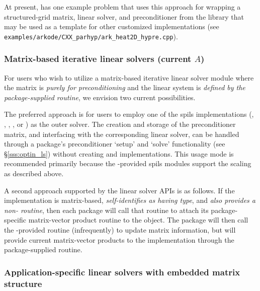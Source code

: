 At present, {\sundials} has one example problem that uses this approach for
wrapping a structured-grid matrix, linear solver, and preconditioner from the
{\hypre} library that may be used as a template for other customized
implementations
(see \texttt{examples/arkode/CXX\_parhyp/ark\_heat2D\_hypre.cpp}).

\subsubsection*{Matrix-based iterative linear solvers (current $A$)}

For users who wish to utilize a matrix-based iterative linear solver module
where the matrix is \textit{purely for preconditioning} and the linear system is
\textit{defined by the package-supplied  routine}, we envision two
current possibilities.

The preferred approach is for users to employ one of the {\sundials}
spils {\sunlinsol} implementations ({\sunlinsolspgmr}, {\sunlinsolspfgmr},
{\sunlinsolspbcgs}, {\sunlinsolsptfqmr}, or {\sunlinsolpcg}) as the outer
solver. The creation and storage of the preconditioner matrix, and interfacing
with the corresponding linear solver, can be handled through a package's
preconditioner `setup' and `solve' functionality (see \S\ref{sss:optin_ls})
without creating {\sunmatrix} and {\sunlinsol} implementations. This usage mode
is recommended primarily because the {\sundials}-provided spils modules support
the scaling as described above.

A second approach supported by the linear solver APIs is as follows. If the
{\sunlinsol} implementation is matrix-based, \textit{self-identifies
as having  type}, and \emph{also provides a
non-  routine}, then each {\sundials} package
will call that routine to attach its package-specific matrix-vector product
routine to the {\sunlinsol} object. The {\sundials} package will then call the
{\sunlinsol}-provided  routine (infrequently) to update
matrix information, but will provide current matrix-vector products to the
{\sunlinsol} implementation through the package-supplied  routine.

\subsubsection*{Application-specific linear solvers with embedded matrix structure}

